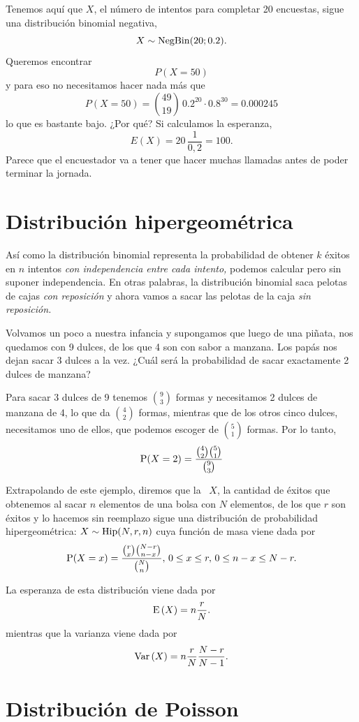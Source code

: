 Tenemos aquí que \(X\), el número de intentos para completar 20 encuestas, sigue una distribución binomial negativa, \[X\sim\operatorname{NegBin}(20; \num{0,2}).\] Queremos encontrar \[P(X=50)\] y para eso no necesitamos hacer nada más que \[P(X=50) = \binom{49}{19}\,\num{0,2}^{20}\cdot\num{0,8}^{30} = \num{0.000245}\] lo que es bastante bajo. ¿Por qué? Si calculamos la esperanza, \[E(X) = 20\,\frac{1}{0,2} = 100.\] Parece que el encuestador va a tener que hacer muchas llamadas antes de poder terminar la jornada.

\section{Distribución hipergeométrica}

Así como la distribución binomial representa la probabilidad de obtener \(k\) éxitos en \(n\) intentos \emph{con independencia entre cada intento,} podemos calcular  pero sin suponer independencia. En otras palabras, la distribución binomial saca pelotas de cajas \emph{con reposición} y ahora vamos a sacar las pelotas de la caja \emph{sin reposición.}

Volvamos un poco a nuestra infancia y supongamos que luego de una piñata, nos quedamos con 9 dulces, de los que 4 son con sabor a manzana. Los papás nos dejan sacar 3 dulces a la vez. ¿Cuál será la probabilidad de sacar exactamente 2 dulces de manzana?

Para sacar 3 dulces de 9 tenemos \(\binom{9}{3}\) formas y necesitamos 2 dulces de manzana de 4, lo que da \(\binom{4}{2}\) formas, mientras que de los otros cinco dulces, necesitamos uno de ellos, que podemos escoger de \(\binom{5}{1}\) formas. Por lo tanto, \[\operatorname{P}(X=2) = \frac{\binom{4}{2}\binom{5}{1}}{\binom{9}{3}}\]

Extrapolando de este ejemplo, diremos que la \va\ \(X\), la cantidad de éxitos que obtenemos al sacar \(n\) elementos de una bolsa con \(N\) elementos, de los que \(r\) son éxitos y lo hacemos sin reemplazo sigue una distribución de probabilidad hipergeométrica: \(X \sim \operatorname{Hip}(N, r, n)\) cuya función de masa viene dada por \[\operatorname{P}(X=x) = \frac{\binom{r}{x}\binom{N-r}{n-x}}{\binom{N}{n}},\, 0\leq x\leq r,\, 0\leq n-x\leq N-r.\]

La esperanza de esta distribución viene dada por \[\operatorname{E}\left(X\right) = n\frac{r}{N}.\] mientras que la varianza viene dada por \[\operatorname{Var}\left(X\right) = n\frac{r}{N}\frac{N-r}{N-1}.\]

\section{Distribución de Poisson}

